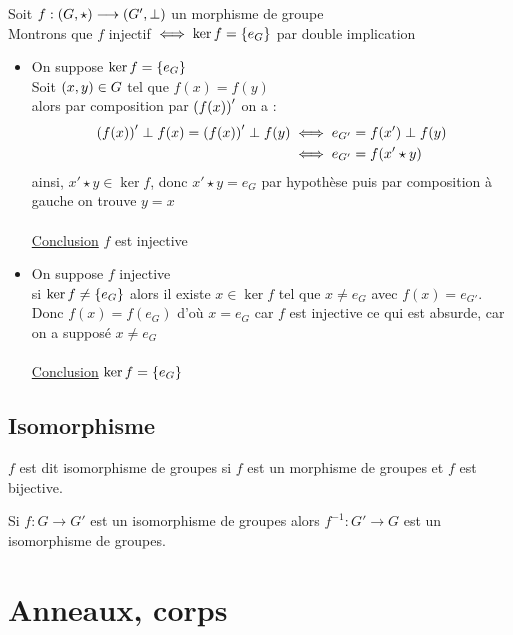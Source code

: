 \begin{dem}
    Soit \(f : \left(G,\star\right) \longrightarrow \left(G', \perp\right)\) un morphisme de groupe\\
    Montrons que \(f\) injectif \( \iff \ker f = \left\lbrace e_G\right\rbrace\) par double implication
    \begin{itemize}
        \item \imprec On suppose \(\ker f = \left\lbrace e_G\right\rbrace\)\\
        Soit \(\left(x,y\right) \in G\) tel que \(f(x) = f(y)\)\\
        alors par composition par \(\left(f(x)\right)'\) on a :
        \begin{align*}
            \left(f(x)\right)' \perp f(x) = \left(f(x)\right)' \perp f(y) &\iff e_{G'} = f(x') \perp f(y)\\
            &\iff e_{G'} = f(x' \star y)
        \end{align*}
        ainsi, \(x' \star y \in \ker f\), donc \(x' \star y = e_G\) par hypothèse puis par composition à gauche on trouve \(y = x\)\\~\\
        \underline{Conclusion} \(f\) est injective
        \item \impdir On suppose \(f\) injective\\
        si \(\ker f \neq \left\lbrace e_G\right\rbrace\) alors il existe \(x \in \ker f\) tel que \(x \neq e_G\) avec \(f(x) = e_{G'}\).\\
        Donc \(f(x) = f(e_G)\) d'où \(x = e_G\) car \(f\) est injective ce qui est absurde, car on a supposé \(x \neq e_G\)\\~\\
        \underline{Conclusion} \(\ker f = \left\lbrace e_G\right\rbrace\)
    \end{itemize}
\end{dem}

\subsection{Isomorphisme}
\begin{defi}
    \(f\) est dit isomorphisme de groupes si \(f\) est un morphisme de groupes et \(f\) est bijective.
\end{defi}

\begin{prop}
    Si \(f : G \to G'\) est un isomorphisme de groupes alors \(f^{-1} : G' \to G\) est un isomorphisme de groupes.
\end{prop}

\section{Anneaux, corps}

